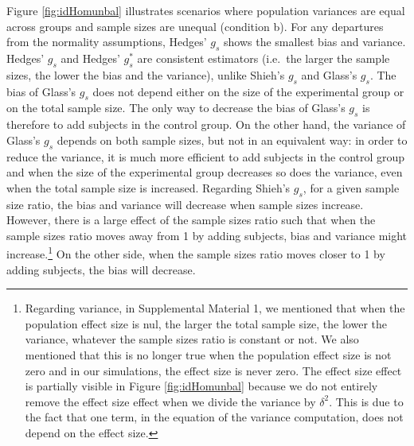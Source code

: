 \documentclass[
  english,
  man,floatsintext]{apa6}
\begin{document}
Figure \ref{fig:idHomunbal} illustrates scenarios where population variances are equal across groups and sample sizes are unequal (condition b). For any departures from the normality assumptions, Hedges' \(g_s\) shows the smallest bias and variance. Hedges' \(g_s\) and Hedges' \(g^*_s\) are consistent estimators (i.e.~the larger the sample sizes, the lower the bias and the variance), unlike Shieh's \(g_s\) and Glass's \(g_s\). The bias of Glass's \(g_s\) does not depend either on the size of the experimental group or on the total sample size. The only way to decrease the bias of Glass's \(g_s\) is therefore to add subjects in the control group. On the other hand, the variance of Glass's \(g_s\) depends on both sample sizes, but not in an equivalent way: in order to reduce the variance, it is much more efficient to add subjects in the control group and when the size of the experimental group decreases so does the variance, even when the total sample size is increased. Regarding Shieh's \(g_s\), for a given sample size ratio, the bias and variance will decrease when sample sizes increase. However, there is a large effect of the sample sizes ratio such that when the sample sizes ratio moves away from 1 by adding subjects, bias and variance might increase.\footnote{Regarding variance, in Supplemental Material 1, we mentioned that when the population effect size is nul, the larger the total sample size, the lower the variance, whatever the sample sizes ratio is constant or not. We also mentioned that this is no longer true when the population effect size is not zero and in our simulations, the effect size is never zero. The effect size effect is partially visible in Figure \ref{fig:idHomunbal} because we do not entirely remove the effect size effect when we divide the variance by $\delta^2$. This is due to the fact that one term, in the equation of the variance computation, does not depend on the effect size.} On the other side, when the sample sizes ratio moves closer to 1 by adding subjects, the bias will decrease.
\end{document}
